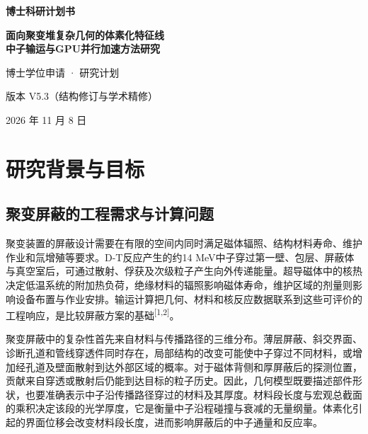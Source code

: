 \documentclass[UTF8, zihao=-4, fontset=none, a4paper]{ctexart}
\newcommand{\upcite}[1]{\textsuperscript{[#1]}}
\begin{document}
\begin{titlepage}
  \centering
  \vspace*{2.4cm}
  {\bfseries 博士科研计划书\par}
  \vspace{1.6cm}
  {\bfseries 面向聚变堆复杂几何的体素化特征线\\[0.6ex]
   中子输运与GPU并行加速方法研究\par}
  \vspace{2.4cm}
  { 博士学位申请 · 研究计划\par}
  \vspace{6cm}
  { 版本 V5.3（结构修订与学术精修）\par}
  \vspace{0.6ex}
  { 2026 年 11 月 8 日\par}
  \vfill
\end{titlepage}

\begingroup
\linespread{1.05}\selectfont
\setlength{\parskip}{0pt}
\tableofcontents
\endgroup
\clearpage

\setcounter{page}{1}




\section{研究背景与目标}\label{sec:1}

\subsection{聚变屏蔽的工程需求与计算问题}

聚变装置的屏蔽设计需要在有限的空间内同时满足磁体辐照、结构材料寿命、维护作业和氚增殖等要求。D-T反应产生的约14 MeV中子穿过第一壁、包层、屏蔽体与真空室后，可通过散射、俘获及次级粒子产生向外传递能量。超导磁体中的核热决定低温系统的附加热负荷，绝缘材料的辐照影响磁体寿命，维护区域的剂量则影响设备布置与作业安排。输运计算把几何、材料和核反应数据联系到这些可评价的工程响应，是比较屏蔽方案的基础\upcite{1,2}。

聚变屏蔽中的复杂性首先来自材料与传播路径的三维分布。薄层屏蔽、斜交界面、诊断孔道和管线穿透件同时存在，局部结构的改变可能使中子穿过不同材料，或增加经孔道及壁面散射到达外部区域的概率。对于磁体背侧和厚屏蔽后的探测位置，贡献来自穿透或散射后仍能到达目标的粒子历史。因此，几何模型既要描述部件形状，也要准确表示中子沿传播路径穿过的材料及其厚度。材料段长度与宏观总截面的乘积决定该段的光学厚度，它是衡量中子沿程碰撞与衰减的无量纲量。体素化引起的界面位移会改变材料段长度，进而影响屏蔽后的中子通量和反应率。
\end{document}
